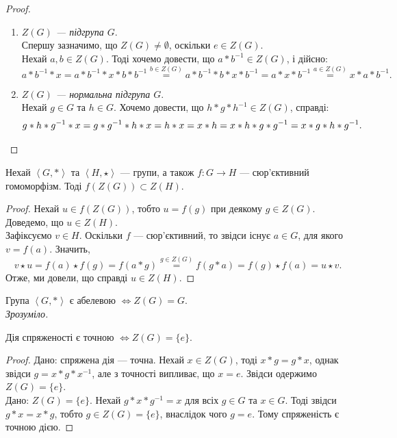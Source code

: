 \documentclass{math_library}
\begin{document}
\begin{proof}
\begin{enumerate}[topsep=0pt,wide=0pt,label={\Roman*.}]
\item \textit{$Z(G)$ --- підгрупа $G$}.\\
Спершу зазначимо, що $Z(G) \neq \emptyset$, оскільки $e \in Z(G)$.\\
Нехай $a,b \in Z(G)$. Тоді хочемо довести, що $a*b^{-1} \in Z(G)$, і дійсно:
\[
a*b^{-1}*x = a*b^{-1}*x*b*b^{-1} \overset{b \in Z(G)}{=} a*b^{-1}*b*x*b^{-1} = a*x*b^{-1} \overset{a \in Z(G)}{=} x*a*b^{-1}.
\]

\item \textit{$Z(G)$ --- нормальна підгрупа $G$}.\\
Нехай $g \in G$ та $h \in G$. Хочемо довести, що $h*g*h^{-1} \in Z(G)$, справді:
\[
g*h*g^{-1}*x = g*g^{-1}*h*x = h*x = x*h = x*h*g*g^{-1} = x*g*h*g^{-1}. \qedhere
\]
\end{enumerate}
\end{proof}

\begin{proposition}
Нехай $\left<G,*\right>$ та $\left<H, \star \right>$ --- групи, а також $f \colon G \to H$ --- сюр'єктивний гомоморфізм. Тоді $f(Z(G)) \subset Z(H)$.
\end{proposition}

\begin{proof}
Нехай $u \in f(Z(G))$, тобто $u = f(g)$ при деякому $g \in Z(G)$. Доведемо, що $u \in Z(H)$.\\
Зафіксуємо $v \in H$. Оскільки $f$ --- сюр'єктивний, то звідси існує $a \in G$, для якого $v = f(a)$. Значить,
\[
v \star u = f(a) \star f(g) = f(a*g) \overset{g \in Z(G)}{=} f(g*a) = f(g) \star f(a) = u \star v.
\]
Отже, ми довели, що справді $u \in Z(H)$.
\end{proof}

\begin{proposition}
Група $\left< G,*\right>$ є абелевою $\iff Z(G) = G$.\\
\textit{Зрозуміло.}
\end{proposition}

\begin{lemma}
Дія спряженості є точною $\iff Z(G) = \{e\}$.
\end{lemma}

\begin{proof}
\rightproof Дано: спряжена дія --- точна. Нехай $x \in Z(G)$, тоді $x*g = g*x$, однак звідси $g = x*g*x^{-1}$, але з точності випливає, що $x = e$. Звідси одержимо $Z(G) = \{e\}$.
\bigskip \\
\leftproof Дано: $Z(G) = \{e\}$. Нехай $g*x*g^{-1} = x$ для всіх $g \in G$ та $x \in G$. Тоді звідси $g*x = x*g$, тобто $g \in Z(G) = \{e\}$, внаслідок чого $g = e$. Тому спряженість є точною дією.
\end{proof}
\end{document}
